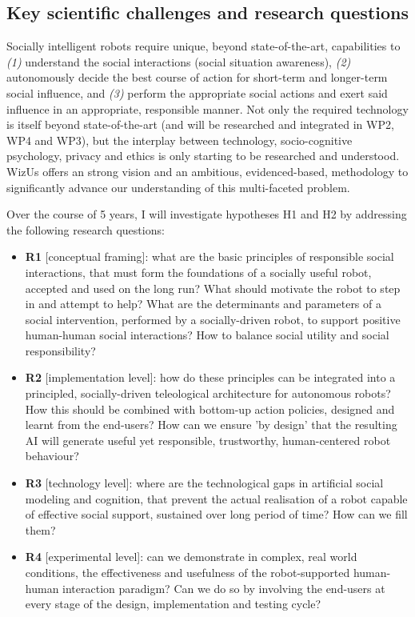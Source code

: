 \documentclass[11pt,a4paper]{report}
\newcommand{\project}{WizUs\xspace}
\begin{document}
\subsection{Key scientific challenges and research questions}

Socially intelligent robots require unique, beyond state-of-the-art,
capabilities to \emph{(1)} understand the social interactions (social
situation awareness), \emph{(2)} autonomously decide the best course of action for
short-term and longer-term social influence, and \emph{(3)} perform the
appropriate social actions and exert said influence in an appropriate,
responsible manner.
Not only the required technology is itself beyond state-of-the-art (and will be
researched and integrated in WP2, WP4 and WP3), but the
interplay between technology, socio-cognitive psychology, privacy and ethics is
only starting to be researched and understood. \project offers an
strong vision and an ambitious, evidenced-based, methodology to significantly
advance our understanding of this multi-faceted problem.

Over the course of 5 years, I will investigate hypotheses H1 and H2
by addressing the following research questions:

\begin{itemize}
    \item \textbf{R1} [conceptual framing]: what are the basic principles of
        responsible social interactions, that must form the foundations of a
        socially useful robot, accepted and used on the long run? What should
        motivate the robot to step in and attempt to help? What are the
        determinants and parameters of a social intervention, performed by a
        socially-driven robot, to support positive human-human social
        interactions? How to balance social utility and social responsibility?

    \item \textbf{R2} [implementation level]: how do these principles
        can be integrated into a principled, socially-driven teleological
        architecture for autonomous robots? How this should be combined with
        bottom-up action policies, designed and learnt from the end-users? How
        can we ensure 'by design' that the resulting AI will generate useful yet
        responsible, trustworthy, human-centered robot behaviour?

    \item \textbf{R3} [technology level]: where are the technological gaps in
        artificial social modeling and cognition, that prevent the actual
        realisation of a robot capable of effective social support, sustained
        over long period of time? How can we fill them?

    \item \textbf{R4} [experimental level]: can we demonstrate in complex, real
        world conditions, the effectiveness and usefulness of the
        robot-supported human-human interaction paradigm? Can we do so by
        involving the end-users at every stage of the design, implementation and
        testing cycle?

\end{itemize}
\end{document}
